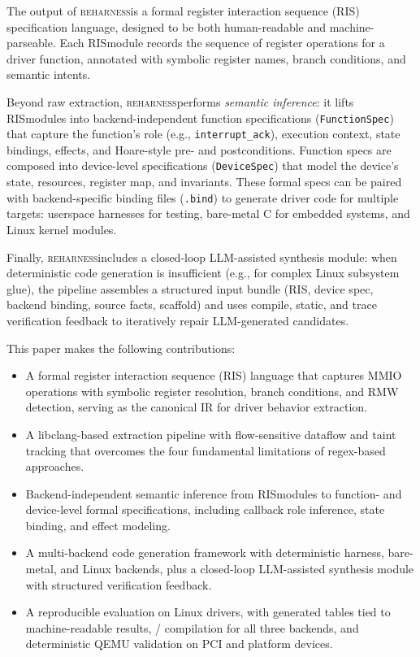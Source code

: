 \documentclass[sigconf,review]{acmart}
\newcommand{\reharness}{\textsc{reharness}}
\newcommand{\rislang}{RIS}
\begin{document}
The output of \reharness is a formal register interaction sequence (\rislang) specification language, designed to be both human-readable and machine-parseable. Each \rislang module records the sequence of register operations for a driver function, annotated with symbolic register names, branch conditions, and semantic intents.

Beyond raw extraction, \reharness performs \emph{semantic inference}: it lifts \rislang modules into backend-independent function specifications (\texttt{FunctionSpec}) that capture the function's role (e.g., \texttt{interrupt\_ack}), execution context, state bindings, effects, and Hoare-style pre- and postconditions. Function specs are composed into device-level specifications (\texttt{DeviceSpec}) that model the device's state, resources, register map, and invariants. These formal specs can be paired with backend-specific binding files (\texttt{.bind}) to generate driver code for multiple targets: userspace harnesses for testing, bare-metal C for embedded systems, and Linux kernel modules.

Finally, \reharness includes a closed-loop LLM-assisted synthesis module: when deterministic code generation is insufficient (e.g., for complex Linux subsystem glue), the pipeline assembles a structured input bundle (\rislang, device spec, backend binding, source facts, scaffold) and uses compile, static, and trace verification feedback to iteratively repair LLM-generated candidates.

This paper makes the following contributions:

\begin{itemize}
\item A formal register interaction sequence (\rislang) language that captures MMIO operations with symbolic register resolution, branch conditions, and RMW detection, serving as the canonical IR for driver behavior extraction.
\item A libclang-based extraction pipeline with flow-sensitive dataflow and taint tracking that overcomes the four fundamental limitations of regex-based approaches.
\item Backend-independent semantic inference from \rislang modules to function- and device-level formal specifications, including callback role inference, state binding, and effect modeling.
\item A multi-backend code generation framework with deterministic harness, bare-metal, and Linux backends, plus a closed-loop LLM-assisted synthesis module with structured verification feedback.
\item A reproducible evaluation on \EvalDrivers{} Linux drivers, with generated tables tied to machine-readable results, \EvalDrivers{}/\EvalDrivers{} compilation for all three backends, and deterministic QEMU validation on PCI and platform devices.
\end{itemize}
\end{document}
